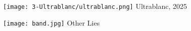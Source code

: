 \begin{titlepage}
  \vspace{2em}
  
  \begin{minipage}[t]{0.5\textwidth}
    \centering
    \texttt{[image: 3-Ultrablanc/ultrablanc.png]}
    {\Large \sffamily Ultrablanc, 2025}
  \end{minipage}%
  \begin{minipage}[t]{0.5\textwidth}
    \centering
    \texttt{[image: band.jpg]}
    {\LARGE \sffamily Other Lies}
  \end{minipage}%
\end{titlepage}

